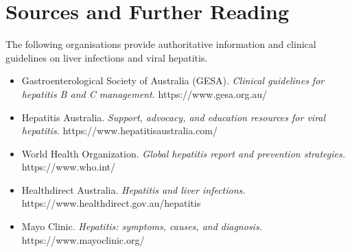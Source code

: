 \section*{Sources and Further Reading}
The following organisations provide authoritative information and clinical guidelines on liver infections and viral hepatitis.
\begin{itemize}
    \item Gastroenterological Society of Australia (GESA). \textit{Clinical guidelines for hepatitis B and C management.} https://www.gesa.org.au/
    \item Hepatitis Australia. \textit{Support, advocacy, and education resources for viral hepatitis.} https://www.hepatitisaustralia.com/
    \item World Health Organization. \textit{Global hepatitis report and prevention strategies.} https://www.who.int/
    \item Healthdirect Australia. \textit{Hepatitis and liver infections.} https://www.healthdirect.gov.au/hepatitis
    \item Mayo Clinic. \textit{Hepatitis: symptoms, causes, and diagnosis.} https://www.mayoclinic.org/
\end{itemize}
